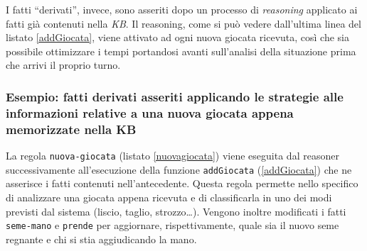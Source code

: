 I fatti ``derivati'', invece, sono asseriti dopo un processo di \emph{reasoning} applicato ai fatti già contenuti nella \emph{KB}.
Il reasoning, come si può vedere dall'ultima linea del listato \ref{addGiocata}, viene attivato ad ogni nuova giocata ricevuta, così che sia possibile ottimizzare i tempi portandosi avanti sull'analisi della situazione prima che arrivi il proprio turno.\\

\subsubsection*{Esempio: fatti derivati asseriti applicando le strategie alle informazioni relative a una nuova giocata appena memorizzate nella KB}

La regola \texttt{nuova-giocata} (listato \ref{nuovagiocata}) viene eseguita dal reasoner successivamente all'esecuzione della funzione \texttt{addGiocata} (\ref{addGiocata}) che ne asserisce i fatti contenuti nell'antecedente.
Questa regola permette nello specifico di analizzare una giocata appena ricevuta e di classificarla in uno dei modi previsti dal sistema (liscio, taglio, strozzo\dots).
Vengono inoltre modificati i fatti \texttt{seme-mano} e \texttt{prende} per aggiornare, rispettivamente, quale sia il nuovo seme regnante e chi si stia aggiudicando la mano.




